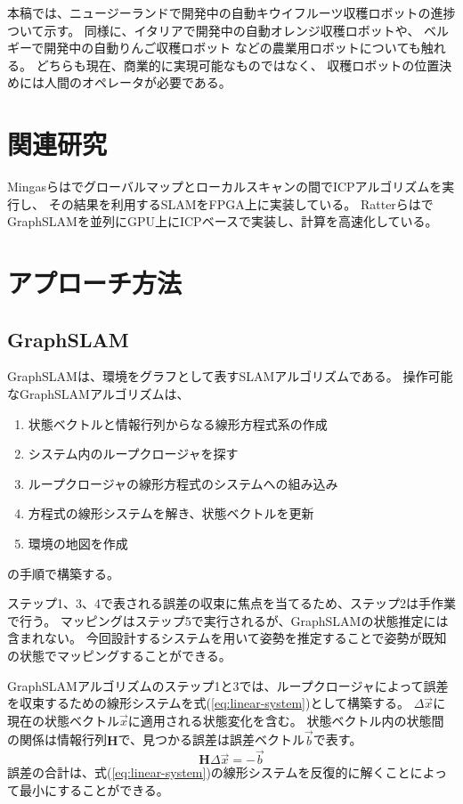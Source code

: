 \documentclass{jsarticle}
\begin{document}
本稿では、ニュージーランドで開発中の自動キウイフルーツ収穫ロボットの進捗ついて示す。
同様に、イタリアで開発中の自動オレンジ収穫ロボットや、
ベルギーで開発中の自動りんご収穫ロボット
などの農業用ロボットについても触れる。
どちらも現在、商業的に実現可能なものではなく、
収穫ロボットの位置決めには人間のオペレータが必要である。

\section{関連研究}
Mingasらは\cite{Mingas2012}でグローバルマップとローカルスキャンの間でICPアルゴリズムを実行し、
その結果を利用するSLAMをFPGA上に実装している。
Ratterらは\cite{Ratter2013}でGraphSLAMを並列にGPU上にICPベースで実装し、計算を高速化している。

\section{アプローチ方法}\label{sec:approach}
\subsection{GraphSLAM}
GraphSLAMは、環境をグラフとして表すSLAMアルゴリズムである。
操作可能なGraphSLAMアルゴリズムは、
\begin{enumerate}
    \item 状態ベクトルと情報行列からなる線形方程式系の作成
    \item システム内のループクロージャを探す
    \item ループクロージャの線形方程式のシステムへの組み込み
    \item 方程式の線形システムを解き、状態ベクトルを更新
    \item 環境の地図を作成
\end{enumerate}
の手順で構築する。

ステップ1、3、4で表される誤差の収束に焦点を当てるため、ステップ2は手作業で行う。
マッピングはステップ5で実行されるが、GraphSLAMの状態推定には含まれない。
今回設計するシステムを用いて姿勢を推定することで姿勢が既知の状態でマッピングすることができる。

GraphSLAMアルゴリズムのステップ1と3では、ループクロージャによって誤差を収束するための線形システムを式(\ref{eq:linear-system})として構築する。
$\Delta\vec{x}$に現在の状態ベクトル$\vec{x}$に適用される状態変化を含む。
状態ベクトル内の状態間の関係は情報行列$\mathbf{H}$で、見つかる誤差は誤差ベクトル$\vec{b}$で表す。
\begin{equation}
    \mathbf{H}\Delta\vec{x}=-\vec{b} \label{eq:linear-system}
\end{equation}
誤差の合計は、式(\ref{eq:linear-system})の線形システムを反復的に解くことによって最小にすることができる。
\end{document}
